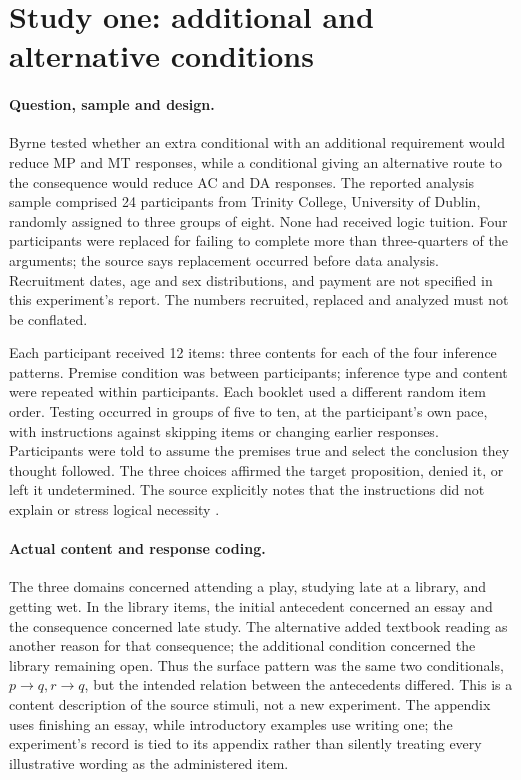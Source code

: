 \section{Study one: additional and alternative conditions}
\label{sec:p19-byrne-suppression-study}

\paragraph{Question, sample and design.}
Byrne tested whether an extra conditional with an additional requirement
would reduce MP and MT responses, while a conditional giving an alternative
route to the consequence would reduce AC and DA responses. The reported
analysis sample comprised 24 participants from Trinity College, University
of Dublin, randomly assigned to three groups of eight. None had received
logic tuition. Four participants were replaced for failing to complete more than
three-quarters of the arguments; the source says replacement occurred before
data analysis. Recruitment dates, age and sex distributions, and payment
are not specified in this experiment's report. The numbers recruited,
replaced and analyzed must not be conflated.

Each participant received 12 items: three contents for each of the four
inference patterns. Premise condition was between participants; inference
type and content were repeated within participants. Each booklet used a
different random item order. Testing occurred in groups of five to ten,
at the participant's own pace, with instructions against skipping items or
changing earlier responses. Participants were told to assume the premises
true and select the conclusion they thought followed. The three choices
affirmed the target proposition, denied it, or left it undetermined.
The source explicitly notes that the instructions did not explain or stress
logical necessity \cite[pp.~67--69]{Byrne1989Suppression}.

\paragraph{Actual content and response coding.}
The three domains concerned attending a play, studying late at a library,
and getting wet. In the library items, the initial antecedent concerned
an essay and the consequence concerned late study. The alternative added
textbook reading as another reason for that consequence; the additional
condition concerned the library remaining open. Thus the surface pattern
was the same two conditionals, \(p\to q,r\to q\), but the intended
relation between the antecedents differed. This is a content description
of the source stimuli, not a new experiment. The appendix uses finishing
an essay, while introductory examples use writing one; the experiment's
record is tied to its appendix rather than silently treating every
illustrative wording as the administered item.

